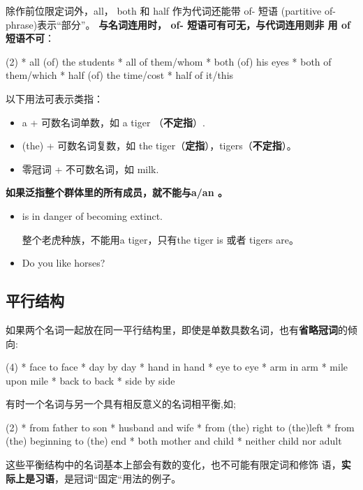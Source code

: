 除作前位限定词外，all， both 和 half 作为代词还能带 of- 短语 (partitive
of-phrase)表示“部分”。 \textbf{与名词连用时， of- 短语可有可无，与代词连用则非
  用 of短语不可}：
\begin{taskitem}(2)
  * all (of) the students
  * all of them/whom
  * both (of) his eyes
  * both of them/which
  * half (of) the time/cost
  * half of it/this
\end{taskitem}

以下用法可表示类指：
\begin{itemize}
\item a + 可数名词单数，如 a tiger （\textbf{不定指}）.
\item (the) + 可数名词复数，如 the tiger（\textbf{定指}），tigers（\textbf{不定指}）。
\item 零冠词 + 不可数名词，如 milk.
\end{itemize}

\textbf{如果泛指整个群体里的所有成员，就不能与a/an 。}
\begin{itemize}
\item {} is in danger of becoming extinct.

  整个老虎种族，不能用a tiger，只有the tiger is 或者 tigers are。

\item Do you like horses?
\end{itemize}

\subsection{平行结构}

如果两个名词一起放在同一平行结构里，即使是单数具数名词，也有\textbf{省略冠词}的倾向:
\begin{taskitem}(4)
  * face to face
  * day by day
  * hand in hand
  * eye to eye
  * arm in arm
  * mile upon mile
  * back to back
  * side by side
\end{taskitem}

有时一个名词与另一个具有相反意义的名词相平衡,如;
\begin{taskitem}(2)
* from father to son
* husband and wife
* from (the) right to (the)left
* from (the) beginning to (the) end
* both mother and child
* neither child nor adult
\end{taskitem}

这些平衡结构中的名词基本上部会有数的变化，也不可能有限定词和修饰
语，\textbf{实际上是习语}，是冠词“固定“用法的例子。



